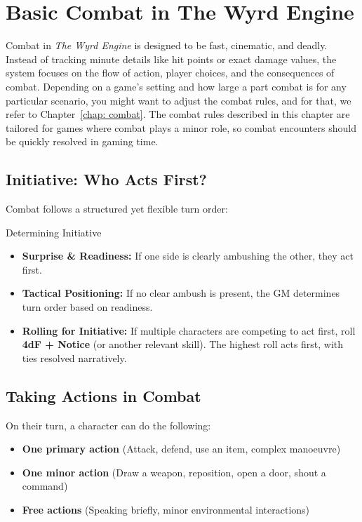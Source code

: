 \section{Basic Combat in The Wyrd Engine}

Combat in \textit{The Wyrd Engine} is designed to be fast, cinematic, and deadly. Instead of tracking minute details like hit points or exact damage values, the system focuses on the flow of action, player choices, and the consequences of combat. Depending on a game's setting and how large a part combat is for any particular scenario, you might want to adjust the combat rules, and for that, we refer to Chapter~\ref{chap: combat}. The combat rules described in this chapter are tailored for games where combat plays a minor role, so combat encounters should be quickly resolved in gaming time.

\subsection{Initiative: Who Acts First?}

Combat follows a structured yet flexible turn order:

\begin{DndReadAloud}{Determining Initiative}
	\begin{itemize}
    	\item \textbf{Surprise \& Readiness:} If one side is clearly ambushing the other, they act first.
	    \item \textbf{Tactical Positioning:} If no clear ambush is present, the GM determines turn order based on readiness.
	    \item \textbf{Rolling for Initiative:} If multiple characters are competing to act first, roll \textbf{4dF + Notice} (or another relevant skill). The highest roll acts first, with ties resolved narratively.
	\end{itemize}
\end{DndReadAloud}

\subsection{Taking Actions in Combat}

On their turn, a character can do the following:
\begin{itemize}
    \item \textbf{One primary action} (Attack, defend, use an item, complex manoeuvre)
    \item \textbf{One minor action} (Draw a weapon, reposition, open a door, shout a command)
    \item \textbf{Free actions} (Speaking briefly, minor environmental interactions)
\end{itemize}

